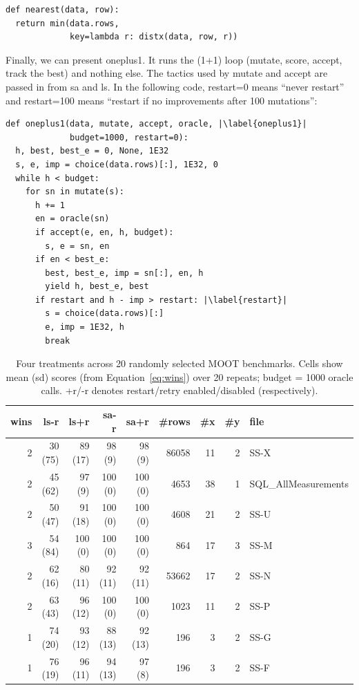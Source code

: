 \documentclass[AMA,STIX2COL]{WileyNJDv5}
\begin{document}
{\begin{verbatim}
def nearest(data, row): 
  return min(data.rows, 
             key=lambda r: distx(data, row, r))
\end{verbatim}
Finally, we can present \textsf{oneplus1}.   It runs the (1+1) loop
(mutate, score, accept, track the best) and nothing else. The
tactics used by \textsf{mutate} and \textsf{accept} are passed in
from \textsf{sa} and \textsf{ls}.
In the following code,
\textsf{restart=0} means ``never restart'' and \textsf{restart=100}
means ``restart if no improvements after 100 mutations'':
\begin{verbatim}
def oneplus1(data, mutate, accept, oracle, |\label{oneplus1}|
             budget=1000, restart=0): 
  h, best, best_e = 0, None, 1E32
  s, e, imp = choice(data.rows)[:], 1E32, 0
  while h < budget:
    for sn in mutate(s):
      h += 1
      en = oracle(sn)
      if accept(e, en, h, budget):
        s, e = sn, en
      if en < best_e:
        best, best_e, imp = sn[:], en, h
        yield h, best_e, best
      if restart and h - imp > restart: |\label{restart}|
        s = choice(data.rows)[:]
        e, imp = 1E32, h
        break
\end{verbatim}
\begin{table}[t]
\centering\scriptsize
\caption{Four treatments across 20 randomly selected MOOT benchmarks. Cells show
mean (sd) scores (from Equation~\ref{eq:wins}) over 20 repeats; budget = 1000 oracle calls. +r/-r denotes restart/retry enabled/disabled (respectively).}
\label{tab:opt}
\begin{tabular}{rrrrrrrrl}
wins & ls-r & ls+r & sa-r & sa+r & \#rows & \#x & \#y & file \\
\midrule
2 &  30 (75) &  89 (17) &  98 (9)  &  98 (9)  & 86058 & 11 & 2 & SS-X \\
2 &  45 (62) &  97 (9)  & 100 (0)  & 100 (0)  &  4653 & 38 & 1 & SQL\_AllMeasurements \\
2 &  50 (47) &  91 (18) & 100 (0)  & 100 (0)  &  4608 & 21 & 2 & SS-U \\
3 &  54 (84) & 100 (0)  & 100 (0)  & 100 (0)  &   864 & 17 & 3 & SS-M \\
2 &  62 (16) &  80 (11) &  92 (11) &  92 (11) & 53662 & 17 & 2 & SS-N \\
2 &  63 (43) &  96 (12) & 100 (0)  & 100 (0)  &  1023 & 11 & 2 & SS-P \\
1 &  74 (20) &  93 (12) &  88 (13) &  92 (13) &   196 &  3 & 2 & SS-G \\
1 &  76 (19) &  96 (11) &  94 (13) &  97 (8)  &   196 &  3 & 2 & SS-F \\

\end{tabular}
\end{table}}
\end{document}
